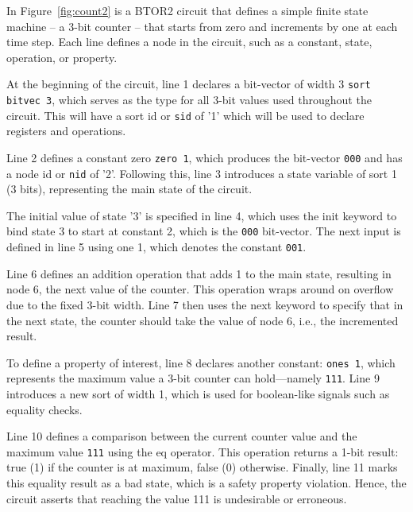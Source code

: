 In Figure~\ref{fig:count2} is a BTOR2 circuit that defines a simple finite state machine -- a 3-bit counter -- that starts from zero and increments by one at each time step. Each line defines a node in the circuit, such as a constant, state, operation, or property.



At the beginning of the circuit, line 1 declares a bit-vector of width 3 \verb|sort bitvec 3|, which serves as the type for all 3-bit values used throughout the circuit. This will have a sort id or \verb|sid| of '1' which will be used to declare registers and operations.

Line 2 defines a constant zero \verb|zero 1|, which produces the bit-vector \verb|000| and has a node id or \verb|nid| of '2'. Following this, line 3 introduces a state variable of sort 1 (3 bits), representing the main state of the circuit.

The initial value of state '3' is specified in line 4, which uses the init keyword to bind state 3 to start at constant 2, which is the \verb|000| bit-vector. The next input is defined in line 5 using one 1, which denotes the constant \verb|001|.

Line 6 defines an addition operation that adds 1 to the main state, resulting in node 6, the next value of the counter. This operation wraps around on overflow due to the fixed 3-bit width. Line 7 then uses the next keyword to specify that in the next state, the counter should take the value of node 6, i.e., the incremented result.

To define a property of interest, line 8 declares another constant: \verb|ones 1|, which represents the maximum value a 3-bit counter can hold—namely \verb|111|. Line 9 introduces a new sort of width 1, which is used for boolean-like signals such as equality checks.

Line 10 defines a comparison between the current counter value and the maximum value \verb|111| using the eq operator. This operation returns a 1-bit result: true (1) if the counter is at maximum, false (0) otherwise. Finally, line 11 marks this equality result as a bad state, which is a safety property violation. Hence, the circuit asserts that reaching the value 111 is undesirable or erroneous.

